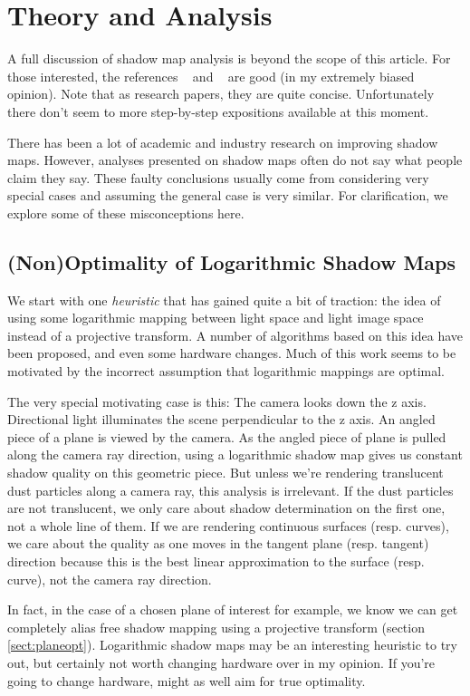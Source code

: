 \documentclass[]{article}  %
\begin{document}
\section{Theory and Analysis}
A full discussion of shadow map analysis is beyond the scope of this article.  For those interested, the references ~\cite{Chong06} and ~\cite{Chong04} are good (in my extremely biased opinion).  Note that as research papers, they are quite concise.  Unfortunately there don't seem to more step-by-step expositions available at this moment.  

There has been a lot of academic and industry research on improving shadow maps.  However, analyses presented on shadow maps often do not say what people claim they say.  These faulty conclusions usually come from considering very special cases and assuming the general case is very similar.  For clarification, we explore some of these misconceptions here.  

\subsection{(Non)Optimality of Logarithmic Shadow Maps}
We start with one {\em heuristic} that has gained quite a bit of traction: the idea of using some logarithmic mapping between light space and light image space instead of a projective transform.  A number of algorithms based on this idea have been proposed, and even some hardware changes.  Much of this work seems to be motivated by the incorrect assumption that logarithmic mappings are optimal.  

The very special motivating case is this:  The camera looks down the z axis.  Directional light illuminates the scene perpendicular to the z axis.  An angled piece of a plane is viewed by the camera.  As the angled piece of plane is pulled along the camera ray direction, using a logarithmic shadow map gives us constant shadow quality on this geometric piece.  But unless we're rendering translucent dust particles along a camera ray, this analysis is irrelevant.  If the dust particles are not translucent, we only care about shadow determination on the first one, not a whole line of them.  If we are rendering continuous surfaces (resp. curves), we care about the quality as one moves in the tangent plane (resp. tangent) direction because this is the best linear approximation to the surface (resp. curve), not the camera ray direction.  

In fact, in the case of a chosen plane of interest for example, we know we can get completely alias free shadow mapping using a projective transform (section \ref{sect:planeopt}).  Logarithmic shadow maps may be an interesting heuristic to try out, but certainly not worth changing hardware over in my opinion.  If you're going to change hardware, might as well aim for true optimality.  
\end{document}
